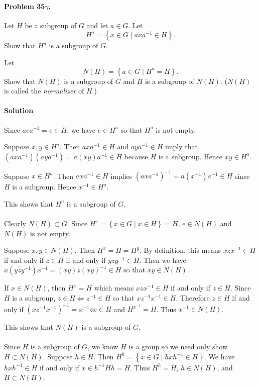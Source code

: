 \paragraph{Problem 35$\gamma$.}
Let $H$ be a subgroup of $G$ and let $a \in G$. Let
$$ H^a = \left\{x \in G \mid axa^{-1} \in H \right\}. $$
Show that $H^a$ is a subgroup of $G$.

Let $$N(H) = \left\{ a \in G \mid H^a = H \right\}.$$
Show that $N(H)$ is a subgroup of $G$ and $H$ is a subgroup of $N(H)$.
($N(H)$ is called the \textit{normalizer} of $H$.)

\paragraph*{Solution}
Since $aea^{-1}=e\in H$, we have $e\in H^a$ so that $H^a$ is not empty.

Suppose $x, y \in H^a$. Then $axa^{-1} \in H$ and $aya^{-1} \in H$ imply that
$(axa^{-1})(aya^{-1}) = a(xy)a^{-1} \in H$ because $H$ is a subgroup. Hence
$xy \in H^a$.

Suppose $x \in H^a$. Then $axa^{-1} \in H$ implies
$(axa^{-1})^{-1} = a(x^{-1})a^{-1} \in H$ since $H$ is a subgroup. Hence
$x^{-1} \in H^a$.

This shows that $H^a$ is a subgroup of $G$.

\paragraph{}
Clearly $N(H) \subset G$. Since $H^e=\left\{x\in G \mid x\in H \right\}=H$,
$e \in N(H)$ and $N(H)$ is not empty.

Suppose $x, y \in N(H)$. Then $H^x = H = H^y$. By definition, this means
$xzx^{-1} \in H$ if and only if $z \in H$ if and only if $yzy^{-1} \in H$.
Then we have $x(yzy^{-1})x^{-1} = (xy)z(xy)^{-1} \in H$ so that $xy \in N(H)$.

If $x \in N(H)$, then $H^x=H$ which means $xzx^{-1} \in H$ if and only if
$z \in H$. Since $H$ is a subgroup, $z \in H \Leftrightarrow z^{-1} \in H$ so that
$xz^{-1}x^{-1} \in H$. Therefore $z \in H$ if and only if
$(xz^{-1}x^{-1})^{-1} = x^{-1}zx \in H$ and $H^{x^{-1}} = H$. Thus $x^{-1} \in N(H)$.

This shows that $N(H)$ is a subgroup of $G$.

\paragraph{}
Since $H$ is a subgroup of $G$, we know $H$ is a group so we need only show
$H \subset N(H)$. Suppose $h \in H$. Then $H^h = \left\{x \in G \mid hxh^{-1} \in H \right\}$.
We have $hxh^{-1} \in H$ if and only if $x \in h^{-1}Hh = H$. Thus $H^h=H$,
$h\in N(H)$, and $H \subset N(H)$.

